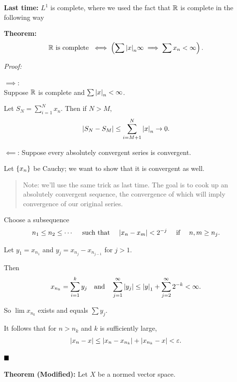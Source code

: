 \textbf{Last time:} \(L^1\) is complete, where we used the fact that
\({\mathbb{R}}\) is complete in the following way

\textbf{Theorem:} \begin{align*}
{\mathbb{R}} \text{ is complete } \iff \left( \sum {\left\lvert {x} \right\rvert}_n \infty \implies \sum x_n < \infty \right)
.\end{align*}

\emph{Proof:}

\(\implies\):\\
Suppose \({\mathbb{R}}\) is complete and \(\sum {\left\lvert {x} \right\rvert}_n < \infty\).

Let \(S_N = \sum_{i=1}^N x_n\). Then if \(N > M\),
\begin{align*}
{\left\lvert {S_N - S_M} \right\rvert} \leq \sum_{i=M+1}^N {\left\lvert {x} \right\rvert}_n \to 0
.\end{align*}

\(\impliedby\): Suppose every absolutely convergent series is
convergent.

Let \(\left\{{x_n}\right\}\) be Cauchy; we want to show that it is convergent as
well.

\begin{quote}
Note: we'll use the same trick as last time. The goal is to cook up an
absolutely convergent sequence, the convergence of which will imply
convergence of our original series.
\end{quote}

Choose a subsequence
\begin{align*}
n_1 \leq n_2 \leq \cdots \quad \text{ such that }\quad  {\left\lvert {x_n - x_m} \right\rvert} < 2^{-j} \quad \text{ if }\quad  n, m \geq n_j
.\end{align*}

Let \(y_1 = x_{n_1}\) and \(y_j = x_{n_j} - x_{n_{j-1}}\) for \(j > 1\).

Then
\begin{align*}
x_{n_k} = \sum_{i=1}^k y_j \quad \text{and} \quad \sum_{j=1}^\infty {\left\lvert {y_j} \right\rvert} \leq {\left\lvert {y} \right\rvert}_1 + \sum_{j=2}^\infty 2^{-k} < \infty.
\end{align*}

So \(\lim x_{n_k}\) exists and equals \(\sum y_j\).

It follows that for \(n > n_k\) and \(k\) is sufficiently large,
\begin{align*}
{\left\lvert {x_n - x} \right\rvert} \leq {\left\lvert {x_n - x_{n_k}} \right\rvert} + {\left\lvert {x_{n_k} - x} \right\rvert} < \varepsilon
.\end{align*}

\(\qed\)

\textbf{Theorem (Modified):} Let \(X\) be a normed vector space.

